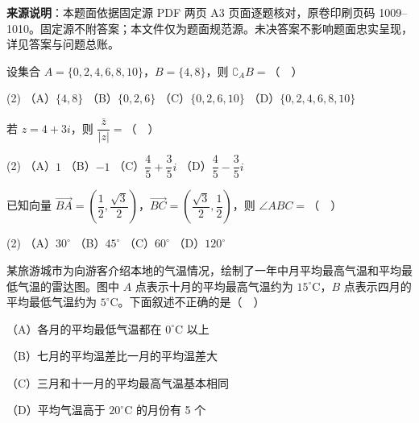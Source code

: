 


\begin{gktip}
\textbf{来源说明}：本题面依据固定源 PDF 两页 A3 页面逐题核对，原卷印刷页码 1009–1010。固定源不附答案；本文件仅为题面规范源。未决答案不影响题面忠实呈现，详见答案与问题总账。
\end{gktip}


\begin{question}
设集合 \(A=\{0,2,4,6,8,10\}\)，\(B=\{4,8\}\)，则 \(\complement_A B=\)（　）

\begin{gkopts}(2)
\task （A）\(\{4,8\}\)
\task （B）\(\{0,2,6\}\)
\task （C）\(\{0,2,6,10\}\)
\task （D）\(\{0,2,4,6,8,10\}\)
\end{gkopts}

\end{question}
\begin{question}
若 \(z=4+3i\)，则 \(\dfrac{\bar z}{|z|}=\)（　）

\begin{gkopts}(2)
\task （A）\(1\)
\task （B）\(-1\)
\task （C）\(\dfrac45+\dfrac35i\)
\task （D）\(\dfrac45-\dfrac35i\)
\end{gkopts}

\end{question}
\begin{question}
已知向量 \(\overrightarrow{BA}=\left(\dfrac12,\dfrac{\sqrt3}{2}\right)\)，\(\overrightarrow{BC}=\left(\dfrac{\sqrt3}{2},\dfrac12\right)\)，则 \(\angle ABC=\)（　）

\begin{gkopts}(2)
\task （A）\(30^\circ\)
\task （B）\(45^\circ\)
\task （C）\(60^\circ\)
\task （D）\(120^\circ\)
\end{gkopts}

\Needspace{0.4\textheight}
\end{question}
\begin{question}
某旅游城市为向游客介绍本地的气温情况，绘制了一年中月平均最高气温和平均最低气温的雷达图。图中 \(A\) 点表示十月的平均最高气温约为 \(15^\circ\mathrm C\)，\(B\) 点表示四月的平均最低气温约为 \(5^\circ\mathrm C\)。下面叙述不正确的是（　）
\nopagebreak[4]
\begin{center}\end{center}
\nopagebreak[4]
（A）各月的平均最低气温都在 \(0^\circ\mathrm C\) 以上

（B）七月的平均温差比一月的平均温差大

（C）三月和十一月的平均最高气温基本相同

（D）平均气温高于 \(20^\circ\mathrm C\) 的月份有 5 个

\end{question}
